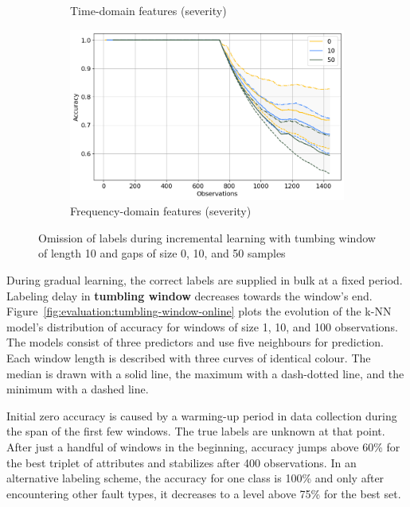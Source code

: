\begin{figure}[]
\begin{subfigure}[b]{0.48\textwidth}
        \caption{Time-domain features (severity)}
    \end{subfigure}
    \hfill
    \begin{subfigure}[b]{0.48\textwidth}
        \includegraphics[width=\textwidth]{assets/results/incremental-learning/skip-label-FD-severity.png}
        \caption{Frequency-domain features (severity)}
    \end{subfigure} 
    \caption{Omission of labels during incremental learning with tumbing window of length 10 and gaps of size 0, 10, and 50 samples}
    \label{fig:evaluation:label-skips-online}
\end{figure}

During gradual learning, the correct labels are supplied in bulk at a fixed period. Labeling delay in \textbf{tumbling window} decreases towards the window's end. Figure~\ref{fig:evaluation:tumbling-window-online} plots the evolution of the k-NN model's distribution of accuracy for windows of size 1, 10, and 100 observations. The models consist of three predictors and use five neighbours for prediction. Each window length is described with three curves of identical colour. The median is drawn with a solid line, the maximum with a dash-dotted line, and the minimum with a dashed line.

Initial zero accuracy is caused by a warming-up period in data collection during the span of the first few windows. The true labels are unknown at that point. After just a handful of windows in the beginning, accuracy jumps above 60\% for the best triplet of attributes and stabilizes after 400 observations. In an alternative labeling scheme, the accuracy for one class is 100\% and only after encountering other fault types, it decreases to a level above 75\% for the best set.

